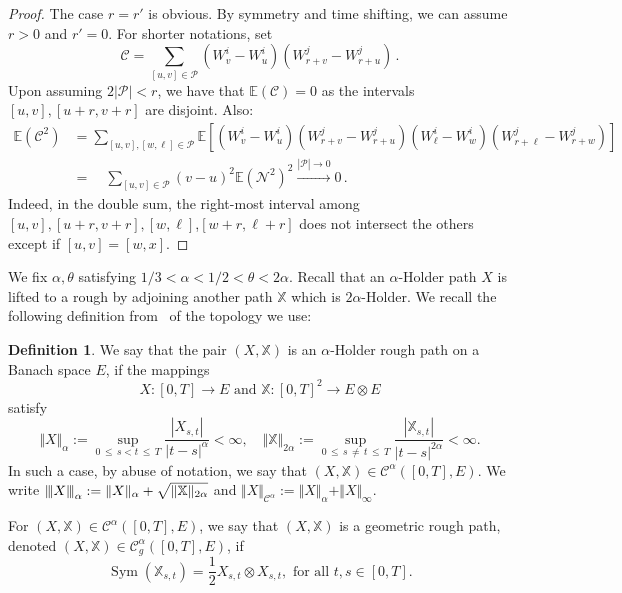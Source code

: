 \documentclass[11pt]{article}
\theoremstyle{definition}
\newtheorem{defi}[theo]{Definition}
\numberwithin{equation}{section}
\numberwithin{figure}{section}
\numberwithin{table}{section}
\DeclareMathOperator{\Sym}{Sym}
\newcommand{\alp}{\alpha}%
\newcommand*\E{\mathbb{E}}
\newcommand*\X{\mathbb{X}}
\newcommand*\Cc{\mathcal{C}}
\newcommand*\Nc{\mathcal{N}}
\newcommand*\Pc{\mathcal{P}}
\newcommand{\vertiii}[1]{{\left\vert\kern-0.25ex\left\vert\kern-0.25ex\left\vert #1
\right\vert\kern-0.25ex\right\vert\kern-0.25ex\right\vert}}
\begin{document}
\begin{proof}
The case $r=r'$ is obvious. By symmetry and time shifting, we can assume $r>0$ and $r'=0$. For shorter notations, set
\[
\Cc =\sum_{[u,v] \in \Pc} \left(W^i_v - W^i_u \right) \left(W^j_{r+v} - W^j_{r+u} \right)\,.
\]
Upon assuming $2|\Pc|<r$, we have that $\E\left(\Cc \right) = 0$ as the intervals $[u,v], [u+r, v+r]$ are disjoint. Also:
\begin{align*}
\E\left(\Cc^2 \right) &=\sum_{[u,v], [w,\ell] \in \Pc}
\E\left[\left(W^i_v - W^i_u \right) \left(W^j_{r+v} - W^j_{r+u} \right)
\left(W^i_\ell - W^i_w \right) \left(W^j_{r+\ell} - W^j_{r+w} \right)
\right]\\
&=\quad\sum_{[u,v] \in \Pc} (v-u)^2 \E\left(\Nc^2 \right)^2 \stackrel{|\Pc| \rightarrow 0}{\longrightarrow} 0 \,.
\end{align*}
Indeed, in the double sum, the right-most interval among $[u,v], [u+r, v+r], [w,\ell]$,\linebreak $[w+r, \ell+r]$ does not intersect the others except if $[u,v] = [w,x]$.
\end{proof}


We fix $\alp,\theta$ satisfying $1/3<\alp<1/2< \theta<2\alp$. Recall that an $\alp$-Holder path $X$ is lifted to a rough by adjoining another path $\X$ which is $2\alpha$-Holder. We recall the following definition from~\cite{FH14} of the topology we use:

\begin{defi}\label{def-alpha-holder}
We say that the pair $(X,\X)$ is an $\alpha$-Holder rough path on a Banach space $E$, if the mappings
\[
X:[0,T]\to E\text{ and } \X:[0,T]^2 \to E\otimes E
\]
satisfy
\begin{equation}
\Vert X\Vert_\alp:= \sup_{0\,\leq\,s<t\,\leq\,T} \frac{|X_{s,t}|}{|t-s|^\alp}<\infty,\quad \Vert \X\Vert_{2\alp}:= \sup_{0\,\leq\,s\,\neq\,t\,\leq\,T}\frac{|\X_{s,t}|}{|t-s|^{2\alp}}<\infty.
\end{equation}
In such a case, by abuse of notation, we say that $(X,\X)\in \Cc^\alp([0,T],E)$. We write $\vertiii {X }_{\alp}:=\Vert X\Vert_{\alp}+\sqrt{\Vert\X\Vert_{2\alp}}$ and $\Vert X\Vert_{\Cc^\alp}:=\Vert X\Vert_{\alp}+\Vert X\Vert_{\infty}$.

For $(X,\X)\in \Cc^\alp([0,T],E)$, we say that $(X,\X)$ is a geometric rough path, denoted $(X,\X)\in \Cc_g^\alp([0,T],E)$, if
\begin{equation}\label{def-geometric}
\Sym (\X_{s,t})= \frac{1}{2}X_{s,t}\otimes X_{s,t},\text{ for all }t,s\in [0,T].
\end{equation}
\end{defi}
\end{document}
